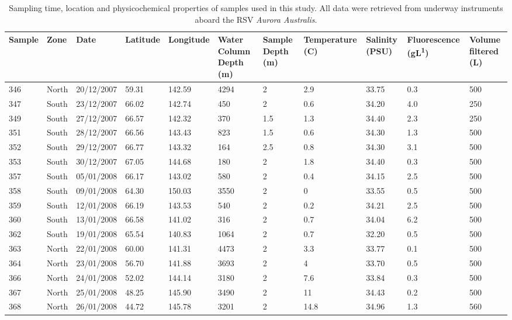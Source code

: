 \begin{landscape}
\begin{table}
\sffamily
\caption[Details of samples used in Polar Front study]{\sffamily{}Sampling time, location and physicochemical properties of samples used in this study.
All data were retrieved from underway instruments aboard the RSV \textit{Aurora Australis}.}
\label{tab:samplelist}
\begin{tabu} to\linewidth{llllXIXZXXX}
\toprule
\textbf{Sample} & \textbf{Zone} & \textbf{Date} & \textbf{Latitude} & \textbf{Longitude} & \textbf{Water Column Depth (m)} & \textbf{Sample Depth (m)} & \textbf{Temperature (\textdegree{}C)} & \textbf{Salinity (PSU)} & \textbf{Fluorescence (\textmu{}gL\textsuperscript{\textminus{}1})} & \textbf{Volume filtered (L)}\\
\midrule

346 & North & 20/12/2007 & \textminus{}59.31 & 142.59 & 4294 & 2 & 2.9 & 33.75 & 0.3 & 500\\
347 & South & 23/12/2007 & \textminus{}66.02 & 142.74 & 450 & 2 & 0.6 & 34.20 & 4.0 & 250\\
349 & South & 27/12/2007 & \textminus{}66.57 & 142.32 & 370 & 1.5 & \textminus{}1.3 & 34.40 & 2.3 & 250\\
351 & South & 28/12/2007 & \textminus{}66.56 & 143.43 & 823 & 1.5 & \textminus{}0.6 & 34.30 & 1.3 & 500\\
352 & South & 29/12/2007 & \textminus{}66.77 & 143.32 & 164 & 2.5 & \textminus{}0.8 & 34.30 & 3.1 & 500\\
353 & South & 30/12/2007 & \textminus{}67.05 & 144.68 & 180 & 2 & \textminus{}1.8 & 34.40 & 0.3 & 500\\
357 & South & 05/01/2008 & \textminus{}66.17 & 143.02 & 580 & 2 & \textminus{}0.4 & 34.15 & 2.5 & 500\\
358 & South & 09/01/2008 & \textminus{}64.30 & 150.03 & 3550 & 2 & 0 & 33.55 & 0.5 & 500\\
359 & South & 12/01/2008 & \textminus{}66.19 & 143.53 & 540 & 2 & \textminus{}0.2 & 34.21 & 2.5 & 500\\
360 & South & 13/01/2008 & \textminus{}66.58 & 141.02 & 316 & 2 & \textminus{}0.7 & 34.04 & 6.2 & 500\\
362 & South & 19/01/2008 & \textminus{}65.54 & 140.83 & 1064 & 2 & 0.7 & 32.20 & 0.5 & 500\\
363 & North & 22/01/2008 & \textminus{}60.00 & 141.31 & 4473 & 2 & 3.3 & 33.77 & 0.1 & 500\\
364 & North & 23/01/2008 & \textminus{}56.70 & 141.88 & 3693 & 2 & 4 & 33.70 & 0.5 & 500\\
366 & North & 24/01/2008 & \textminus{}52.02 & 144.14 & 3180 & 2 & 7.6 & 33.84 & 0.3 & 500\\
367 & North & 25/01/2008 & \textminus{}48.25 & 145.90 & 3490 & 2 & 11 & 34.43 & 0.2 & 500\\
368 & North & 26/01/2008 & \textminus{}44.72 & 145.78 & 3201 & 2 & 14.8 & 34.96 & 1.3 & 560\\

\bottomrule
\end{tabu}
\end{table}
\end{landscape}
